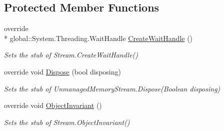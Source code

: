 \subsection*{Protected Member Functions}
\begin{DoxyCompactItemize}
\item 
override \\*
global\-::\-System.\-Threading.\-Wait\-Handle \hyperlink{class_system_1_1_i_o_1_1_fakes_1_1_stub_unmanaged_memory_stream_a0a234e4e2ec2ee5f3c8620552769898c}{Create\-Wait\-Handle} ()
\begin{DoxyCompactList}\small\item\em Sets the stub of Stream.\-Create\-Wait\-Handle()\end{DoxyCompactList}\item 
override void \hyperlink{class_system_1_1_i_o_1_1_fakes_1_1_stub_unmanaged_memory_stream_a16934f76397178b3851e34ec4c428b34}{Dispose} (bool disposing)
\begin{DoxyCompactList}\small\item\em Sets the stub of Unmanaged\-Memory\-Stream.\-Dispose(\-Boolean disposing)\end{DoxyCompactList}\item 
override void \hyperlink{class_system_1_1_i_o_1_1_fakes_1_1_stub_unmanaged_memory_stream_ab628d564e87f129676e067a0ee2f3288}{Object\-Invariant} ()
\begin{DoxyCompactList}\small\item\em Sets the stub of Stream.\-Object\-Invariant()\end{DoxyCompactList}\end{DoxyCompactItemize}
